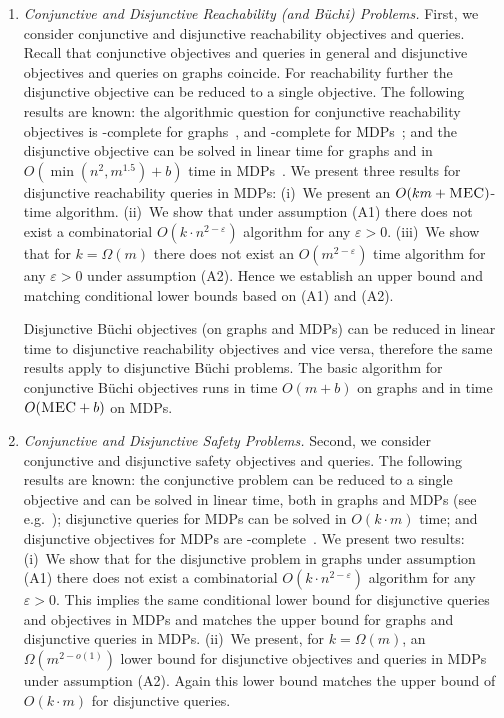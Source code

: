 \documentclass[11pt,letterpaper]{article}
\newcommand{\lu}{\textup{(}}
\newcommand{\ru}{\textup{)}\xspace}
\newcommand{\upbr}[1]{\lu #1\ru}
\newif\iffullversion
\newcommand{\infull}[1]{\iffullversion #1\fi}
\begin{document}
\begin{enumerate}
\item
\emph{Conjunctive and Disjunctive Reachability \upbr{and Büchi} Problems.} 
    First, we consider conjunctive and disjunctive reachability objectives and 
    queries. Recall that conjunctive objectives and queries in general
    and disjunctive objectives and queries on graphs coincide. For reachability
    further the disjunctive objective can be reduced to a single objective\infull{ (see 
    Observation~\ref{obs:disjobjreach})}.
    The following results are known: the algorithmic question for conjunctive 
    reachability objectives is \NP-complete for 
    graphs~\cite{ChatterjeeAM13}, and \PSPACE-complete for MDPs~\cite{FijalkowH12};
    and the disjunctive objective 
    can be solved in linear time for graphs
    and in $O(\min(n^2, m^{1.5}) + b)$ time in MDPs~\cite{ChatterjeeJH03,ChatterjeeH14}.
    We present three results for disjunctive reachability queries in MDPs: 
    (i)~We present an $O(k m + \textsc{MEC})$-time algorithm\infull{\footnote{This implies an $O(\textsc{MEC} + b)$-time algorithm for disjunctive objective but does not 
    improve the running time for this case.}}.
    (ii)~We show that under assumption (A1) there does not exist a combinatorial
    $O(k \cdot n^{2-\varepsilon})$ algorithm for any $\varepsilon > 0$.
    (iii)~We show that for $k = \Omega(m)$ 
    there does not exist an $O(m^{2-\varepsilon})$
     time algorithm for any $\varepsilon > 0$ under assumption (A2). 
     Hence we establish an upper bound and matching conditional lower bounds
     based on (A1) and (A2).

		Disjunctive Büchi objectives (on graphs and MDPs) 
		can be reduced in linear time to disjunctive
		reachability objectives and vice versa, therefore 
		the same results apply to disjunctive Büchi problems\infull{ (see Observation~\ref{obs:Reachability_Buchi})}.
		The basic algorithm for conjunctive Büchi objectives runs in time $O(m+b)$
		on graphs and in time $O(\textsc{MEC}+b)$ on MDPs.
 
\item
\emph{Conjunctive and Disjunctive Safety Problems.}
    Second, we consider conjunctive and disjunctive safety objectives and queries.
    The following results are known: the conjunctive problem can be reduced
    to a single objective and can be solved in linear 
    time, both in graphs and MDPs (see e.g.~\cite{ChatterjeeDH10}); disjunctive queries for MDPs can be solved in $O(k\cdot m)$ time; and disjunctive objectives for MDPs
    are \PSPACE-complete~\cite{FijalkowH12}.
    We present two results: 
    (i)~We show that for the disjunctive problem in graphs 
    under assumption (A1) there does not exist a combinatorial
    $O(k \cdot n^{2-\varepsilon})$ algorithm for any $\varepsilon > 0$.
    This implies the same conditional lower bound for disjunctive queries
    and objectives in MDPs and matches the upper bound for graphs 
    and disjunctive queries in MDPs.
    (ii)~We present, for $k = \Omega(m)$,
    an $\Omega(m^{2-o(1)})$ lower bound for disjunctive 
    objectives and queries in MDPs under assumption (A2). 
    Again this lower bound matches the upper bound of $O(k \cdot m)$
    for disjunctive queries.


\end{enumerate}
\end{document}
